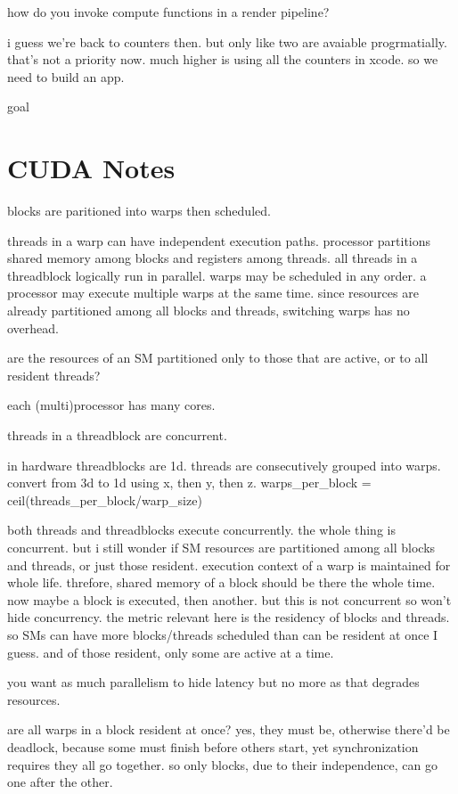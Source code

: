 how do you invoke compute functions in a render pipeline?

i guess we're back to counters then. 
but only like two are avaiable progrmatially. that's not a priority now. much higher is using all the counters in xcode. so we need to build an app. 

goal 


\section{CUDA Notes}

blocks are paritioned into warps then scheduled.

threads in a warp can have independent execution paths. 
processor partitions shared memory among blocks and registers among threads. 
all threads in a threadblock logically run in parallel. 
warps may be scheduled in any order.
a processor may execute multiple warps at the same time.
since resources are already partitioned among all blocks and threads, switching warps has no overhead.

are the resources of an SM partitioned only to those that are active, or to all resident threads?

each (multi)processor has many cores. 

threads in a threadblock are concurrent.

in hardware threadblocks are 1d.
threads are consecutively grouped into warps.
convert from 3d to 1d using x, then y, then z. 
warps_per_block = ceil(threads_per_block/warp_size)

both threads and threadblocks execute concurrently.
the whole thing is concurrent. but i still wonder if SM resources are partitioned among all blocks and threads, or just those resident.
execution context of a warp is maintained for whole life. threfore, shared memory of a block should be there the whole time. now maybe a block is executed, then another. but this is not concurrent so won't hide concurrency. 
the metric relevant here is the residency of blocks and threads. 
so SMs can have more blocks/threads scheduled than can be resident at once I guess. 
and of those resident, only some are active at a time.

you want as much parallelism to hide latency but no more as that degrades resources. 

are all warps in a block resident at once? yes, they must be, otherwise there'd be deadlock, because some must finish before others start, yet synchronization requires they all go together. 
so only blocks, due to their independence, can go one after the other.

